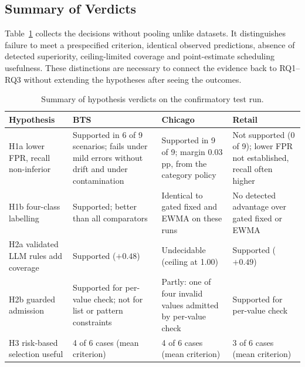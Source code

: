 \subsection{Summary of Verdicts}

Table~\ref{tab:verdicts} collects the decisions without pooling unlike datasets. It distinguishes failure to meet a prespecified criterion, identical observed predictions, absence of detected superiority, ceiling-limited coverage and point-estimate scheduling usefulness. These distinctions are necessary to connect the evidence back to RQ1--RQ3 without extending the hypotheses after seeing the outcomes.

\begin{table}[t]
\caption{Summary of hypothesis verdicts on the confirmatory test run.}
\label{tab:verdicts}
\footnotesize
\begin{tabularx}{\linewidth}{@{}lXXX@{}}
\toprule
Hypothesis & BTS & Chicago & Retail \\
\midrule
H1a lower FPR, recall non-inferior & Supported in 6 of 9 scenarios; fails under mild errors without drift and under contamination & Supported in 9 of 9; margin 0.03 pp, from the category policy & Not supported (0 of 9); lower FPR not established, recall often higher \\
H1b four-class labelling & Supported; better than all comparators & Identical to gated fixed and EWMA on these runs & No detected advantage over gated fixed or EWMA \\
H2a validated LLM rules add coverage & Supported ($+0.48$) & Undecidable (ceiling at 1.00) & Supported ($+0.49$) \\
H2b guarded admission & Supported for per-value check; not for list or pattern constraints & Partly: one of four invalid values admitted by per-value check & Supported for per-value check \\
H3 risk-based selection useful & 4 of 6 cases (mean criterion) & 4 of 6 cases (mean criterion) & 3 of 6 cases (mean criterion) \\
\bottomrule
\end{tabularx}
\end{table}
